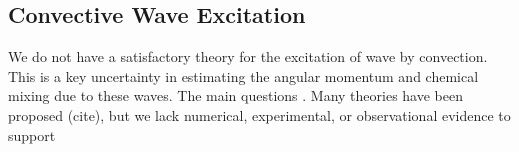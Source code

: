 {\color{purple}
\subsection{Convective Wave Excitation}
}

We do not have a satisfactory theory for the excitation of wave by convection. This is a key uncertainty in estimating the angular momentum and chemical mixing due to these waves. The main questions . Many theories have been proposed (cite), but we lack numerical, experimental, or observational evidence to support  
